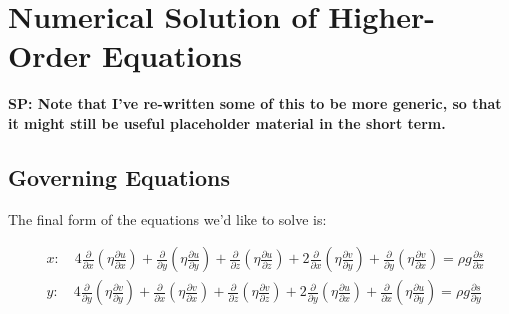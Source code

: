 
\section{Numerical Solution of Higher-Order Equations}
\label{sc:higher-order-numerics}

\textbf{SP: Note that I've re-written some of this to be more generic, so that it might still be useful placeholder material in the short term.}

\subsection{Governing Equations}
The final form of the equations we'd like to solve is:
 

\begin{align*}
 & x: \quad 4\frac{\partial }{\partial x}\left( \eta \frac{\partial u}{\partial x} \right)+\frac{\partial }{\partial y}\left( \eta \frac{\partial u}{\partial y} \right)+\frac{\partial }{\partial z}\left( \eta \frac{\partial u}{\partial z} \right) + 2\frac{\partial }{\partial x}\left( \eta \frac{\partial v}{\partial y} \right)+\frac{\partial }{\partial y}\left( \eta \frac{\partial v}{\partial x} \right) = \rho g\frac{\partial s}{\partial x} \\ 
 & y: \quad 4\frac{\partial }{\partial y}\left( \eta \frac{\partial v}{\partial y} \right)+\frac{\partial }{\partial x}\left( \eta \frac{\partial v}{\partial x} \right)+\frac{\partial }{\partial z}\left( \eta \frac{\partial v}{\partial z} \right) + 2\frac{\partial }{\partial y}\left( \eta \frac{\partial u}{\partial x} \right)+\frac{\partial }{\partial x}\left( \eta \frac{\partial u}{\partial y} \right) = \rho g\frac{\partial s}{\partial y} \\ 
\end{align*}

